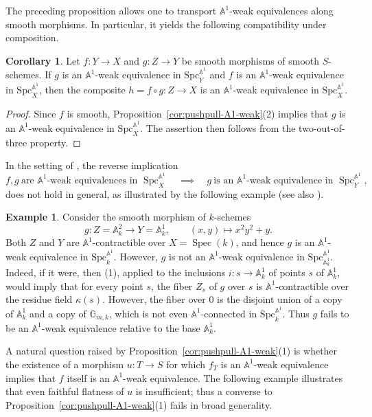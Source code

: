 \documentclass[10pt]{amsart}
\renewcommand{\AA}{\mathbb{A}}
\newcommand{\GG}{\mathbb{G}}
\newcommand{\Spec}{\operatorname{Spec}}
\numberwithin{equation}{section} %
\theoremstyle{plain}
\theoremstyle{definition}
\newtheorem{corollary}[corollary]{Corollary}
\newtheorem{example}[example]{Example}
\theoremstyle{remark}
\newcommand{\Spc}{\operatorname{Spc}}
\begin{document}
The preceding proposition allows one to transport $\AA^1$-weak equivalences along smooth morphisms.  
In particular, it yields the following compatibility under composition.

\begin{corollary}\label{lem:3-from-2}
Let $f:Y\to X$ and $g:Z\to Y$ be smooth morphisms of smooth $S$-schemes.  
If $g$ is an $\AA^1$-weak equivalence in $\mathrm{Spc}_Y^{\AA^1}$ and 
$f$ is an $\AA^1$-weak equivalence in $\mathrm{Spc}_X^{\AA^1}$, 
then the composite $h=f\circ g:Z\to X$ is an $\AA^1$-weak equivalence in $\mathrm{Spc}_X^{\AA^1}$.
\end{corollary}

\begin{proof}
Since $f$ is smooth, Proposition~\ref{cor:pushpull-A1-weak}(2) implies that $g$ is an $\AA^1$-weak equivalence in $\mathrm{Spc}_X^{\AA^1}$. The assertion then follows from the two-out-of-three property.
\end{proof}


In the setting of , the reverse implication 
\[ f,g\ \text{are $\AA^1$-weak equivalences in }\Spc^{\AA^1}_X
\quad \implies \quad
g\ \text{is an $\AA^1$-weak equivalence in }\Spc^{\AA^1}_Y, \]
does not hold in general, as illustrated by the following example (see also ).

\begin{example}\label{ex:A1-cont-not-factorize}
Consider the smooth morphism of $k$-schemes
\[
g:Z=\AA^2_k\to Y=\AA^1_k,\qquad (x,y)\longmapsto x^2y^2+y.
\]
Both $Z$ and $Y$ are $\AA^1$-contractible over $X=\Spec(k)$, and hence $g$ is an $\AA^1$-weak equivalence in $\mathrm{Spc}_k^{\AA^1}$.  
However, $g$ is not an $\AA^1$-weak equivalence in $\mathrm{Spc}_{\AA^1_k}^{\AA^1}$.  
Indeed, if it were, then (1), applied to the inclusions $i:s\to \mathbb{A}^1_k$ of points $s$ of $\AA^1_k$, would imply that for every point $s$, the fiber $Z_s$ of $g$ over $s$ is $\AA^1$-contractible over the residue field $\kappa(s)$. However, the fiber over $0$ is the disjoint union of a copy of $\AA^1_k$ and a copy of $\GG_{m,k}$, which is not even $\AA^1$-connected in $\mathrm{Spc}_k^{\AA^1}$.  
Thus $g$ fails to be an $\AA^1$-weak equivalence relative to the base $\AA^1_k$.
\end{example}

A natural question raised by Proposition~\ref{cor:pushpull-A1-weak}(1) is whether the existence of a morphism $u: T \to S$ for which $f_T$ is an $\AA^1$-weak equivalence implies that $f$ itself is an $\AA^1$-weak equivalence. 
The following example illustrates that even faithful flatness of $u$ is insufficient; thus a converse to Proposition~\ref{cor:pushpull-A1-weak}(1) fails in broad generality. 
\end{document}
